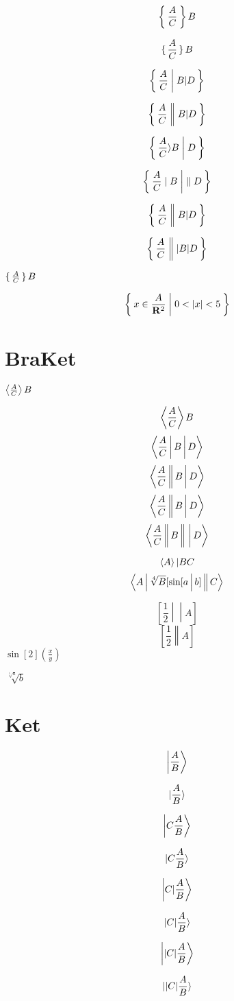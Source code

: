 \documentclass{article}
\begin{document}
\[\Set{\frac{A}{C}}{B}\]

\[\set{\frac{A}{C}}{B}\]

\[\Set{\frac{A}{C} | B | D}\]

\[\Set{\frac{A}{C} \| B | D}\]

\[\Set{\frac{A}{C} \rangle B | D}\]

\[\Set{\frac{A}{C} \mid B | \parallel D}\]

\[\Set{\frac{A}{C} || B | D}\]

\[\Set{\frac{A}{C} ||| B | D}\]

$\set{\frac{A}{C}}{B}$

\[\Set{ x\in\frac{A}{\mathbf{R}^2} | 0<{|x|}<5 }\]



\newpage
\section*{BraKet}
$\Braket{\frac{A}{C}}{B}$

\[\Braket{\frac{A}{C}}{B}\]
\[\Braket{\frac{A}{C} | B | D}\]
\[\Braket{\frac{A}{C} || B | D}\]
\[\Braket{\frac{A}{C} | | B | D}\]
\[\Braket{\frac{A}{C} || B ||| D}\]

\[\Braket A|B C\]
\[\Braket{A|\sqrt[4]{B}[\sin[a|b] ||C}\]

\[\left[ \frac{1}{2}\middle|\middle| A\right ]\]
\[\left[ \frac{1}{2}\middle\| A\right ]\]
$\sin[2](\frac{x}{y})$

$\sqrt[{\sqrt[5]{a}}]{b}$
\newpage
\section*{Ket}
\[\Ket{\frac{A}{B}}\]

\[\ket{\frac{A}{B}}\]

\[\Ket{C\frac{A}{B}}\]

\[\ket{C\frac{A}{B}}\]

\[\Ket{C|\frac{A}{B}}\]

\[\ket{C|\frac{A}{B}}\]

\[\Ket{|C|\frac{A}{B}}\]

\[\ket{|C|\frac{A}{B}}\]
\end{document}
